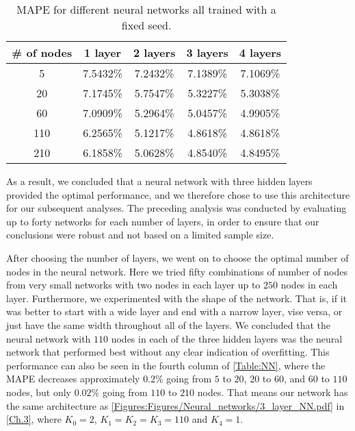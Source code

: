\begin{table}[H]
    \centering
    {\renewcommand{\arraystretch}{1.25}\begin{tabular}{c|cccc}
        \# of nodes &  1 layer & 2 layers & 3 layers & 4 layers\\\hline
        5   & 7.5432\% & 7.2432\% & 7.1389\% & 7.1069\% \\ \hline
        20  & 7.1745\% & 5.7547\% & 5.3227\% & 5.3038\% \\ \hline
        60  & 7.0909\% & 5.2964\% & 5.0457\% & 4.9905\% \\ \hline
        110 & 6.2565\% & 5.1217\% & 4.8618\% & 4.8618\% \\ \hline
        210 & 6.1858\% & 5.0628\% & 4.8540\% & 4.8495\%
    \end{tabular}}
    \caption{MAPE for different neural networks all trained with a fixed seed.}
    \label{Table:NN}
\end{table}

As a result, we concluded that a neural network with three hidden layers provided the optimal performance, and we therefore chose to use this architecture for our subsequent analyses. The preceding analysis was conducted by evaluating up to forty networks for each number of layers, in order to ensure that our conclusions were robust and not based on a limited sample size. 

After choosing the number of layers, we went on to choose the optimal number of nodes in the neural network. Here we tried fifty combinations of number of nodes from very small networks with two nodes in each layer up to $250$ nodes in each layer. Furthermore, we experimented with the shape of the network. That is, if it was better to start with a wide layer and end with a narrow layer, vise versa, or just have the same width throughout all of the layers. We concluded that the neural network with $110$ nodes in each of the three hidden layers was the neural network that performed best without any clear indication of overfitting. This performance can also be seen in the fourth column of \autoref{Table:NN}, where the MAPE decreases approximately $0.2\%$ going from $5$ to $20$, $20$ to $60$, and $60$ to $110$ nodes, but only $0.02\%$ going from $110$ to $210$ nodes. That means our network has the same architecture as \autoref{Figures:Figures/Neural_networks/3_layer_NN.pdf} in \autoref{Ch.3}, where $K_0=2$, $K_1 = K_2 = K_3 = 110$ and $K_4 = 1$.

